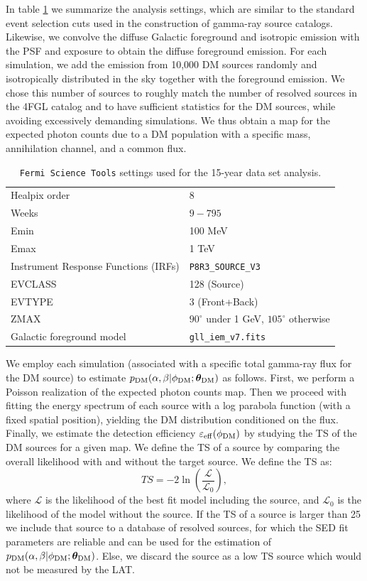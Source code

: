 In table \ref{tab:settings} we summarize the analysis settings, which are similar to the standard event selection cuts used in the construction of gamma-ray source catalogs. 
Likewise, we convolve the diffuse Galactic foreground and isotropic emission with the PSF and exposure to obtain the diffuse foreground emission.
For each simulation, we add the emission from 10,000 DM sources randomly and isotropically distributed in the sky together with the foreground emission. We chose this number of sources to roughly match the number of resolved sources in the 4FGL catalog and to have sufficient statistics for the DM sources, while avoiding excessively demanding simulations. We thus obtain a map for the expected photon counts due to a DM population with a specific mass, annihilation channel, and a common flux.

\begin{table}[t]
\centering
\begin{tabular}{ | l| l|  }
\hline
Healpix order & 8\\ 
Weeks & $9-795$\\ 
Emin & 100 MeV\\
Emax & 1 TeV\\
Instrument Response Functions (IRFs) & \texttt{P8R3\_SOURCE\_V3} \\
EVCLASS & 128 (Source)\\ 
EVTYPE & 3 (Front+Back)\\
ZMAX & $90^\circ$ under 1 GeV, $105^\circ$ otherwise\\
Galactic foreground model & \verb|gll_iem_v7.fits| \\
\hline
\end{tabular}
\caption{\texttt{Fermi Science Tools} settings used for the 15-year data set analysis.}
\label{tab:settings}
\end{table}

We employ each simulation (associated with a specific total gamma-ray flux for the DM source) to estimate $p_{\rm DM}(\alpha,\beta|\phi_{\rm DM};\boldsymbol{\theta}_{\rm DM})$ as follows.
First, we perform a Poisson realization of the expected photon counts map.
Then we proceed with fitting the energy spectrum of each source with a log parabola function (with a fixed spatial position), yielding the DM distribution conditioned on the flux.
Finally, we estimate the detection efficiency $\varepsilon_{\rm eff}(\phi_{\rm DM})$ by studying the TS of the DM sources for a given map. We define the TS of a source by comparing the overall likelihood with and without the target source. We define the TS as:
\begin{equation}
TS = -2\ln\left(\frac{\mathcal{L}}{\mathcal{L}_0}\right),
\end{equation}
where $\mathcal{L}$ is the likelihood of the best fit model including the source, and $\mathcal{L}_0$ is the likelihood of the model without the source. 
If the TS of a source is larger than 25 we include that source to a database of resolved sources, for which the SED fit parameters are reliable and can be used for the estimation of $p_{\rm DM}(\alpha,\beta|\phi_{\rm DM};\boldsymbol{\theta}_{\rm DM})$. Else, we discard the source as a low TS source which would not be measured by the {\Fermi} LAT.

